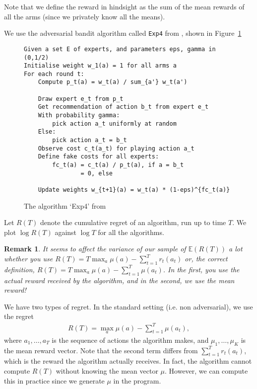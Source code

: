 \documentclass[10pt]{article}
\newtheorem{remark}{Remark}
\newcommand{\EE}{\mathbb{E}}
\begin{document}
Note that we define the reward in hindsight as the sum of the mean rewards of
all the arms (since we privately know all the means).

We use the adversarial bandit algorithm called \verb'Exp4' from \cite{Slivkins},
shown in Figure~\ref{figure-algo-exp4}

\begin{figure}[!ht]
\begin{lstlisting}
Given a set E of experts, and parameters eps, gamma in (0,1/2)
Initialise weight w_1(a) = 1 for all arms a
For each round t:
    Compute p_t(a) = w_t(a) / sum_{a'} w_t(a')

    Draw expert e_t from p_t
    Get recommendation of action b_t from expert e_t
    With probability gamma:
        pick action a_t uniformly at random
    Else: 
        pick action a_t = b_t
    Observe cost c_t(a_t) for playing action a_t
    Define fake costs for all experts:
        fc_t(a) = c_t(a) / p_t(a), if a = b_t
                = 0, else

    Update weights w_{t+1}(a) = w_t(a) * (1-eps)^{fc_t(a)}
\end{lstlisting}
\caption{The algorithm `Exp4' from \cite{Slivkins}}
\label{figure-algo-exp4}
\end{figure}



Let $R(T)$ denote the cumulative regret of an algorithm, run up to time $T$. We
plot $\log R(T)$ against $\log T$ for all the algorithms.


\begin{remark}
    It seems to affect the variance of our sample of $\EE(R(T))$ a lot whether
    you use $R(T) = T \max_a \mu(a) - \sum_{t=1}^T r_t(a_t)$ or, the correct
    definition, $R(T) = T \max_a \mu(a) - \sum_{t=1}^T \mu(a_t)$. In the first,
    you use the actual reward received by the algorithm, and in the second, we
    use the mean reward!
\end{remark}



We have two types of regret. In the standard setting (i.e. non adversarial), we
use the regret
\begin{align*}
    R(T) = \max_a \mu(a) - \sum_{t=1}^T \mu(a_t),
\end{align*}
where $a_1, \ldots, a_T$ is the sequence of actions the algorithm makes, and
$\mu_1, \ldots, \mu_K$ is the mean reward vector. Note that the second term
differs from $\sum_{t=1}^T r_t(a_t)$, which is the reward the algorithm
actually receives. In fact, the algorithm cannot compute $R(T)$ without knowing
the mean vector $\mu$. However, we can compute this in practice since we
generate $\mu$ in the program.
\end{document}
